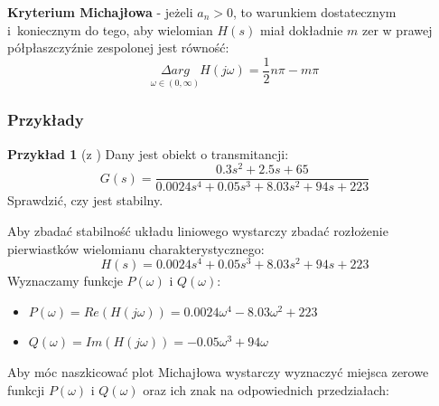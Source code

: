 \documentclass{article}
\begin{document}
    \textbf{Kryterium Michajłowa} - jeżeli $a_{n} > 0$, to warunkiem dostatecznym i~koniecznym do tego, aby wielomian $H(s)$ miał dokładnie $m$ zer w prawej półpłaszczyźnie zespolonej jest równość:
    \begin{equation}\label{eq:kryterium_michajlowa}
         \underset{\omega \in (0, \infty)}{\Delta arg} H(j\omega) = \frac{1}{2}n\pi - m\pi
    \end{equation}

        \subsubsection{Przykłady}
        \textbf{Przykład 1} (z \cite{Grabowski2022})
        Dany jest obiekt o transmitancji:
        $$ 
            G(s) = \frac{0.3s^{2} + 2.5s + 65}{0.0024s^{4} + 0.05s^{3} + 8.03s^{2} + 94s + 223}
        $$
        Sprawdzić, czy jest stabilny.
    
        Aby zbadać stabilność układu liniowego wystarczy zbadać rozłożenie pierwiastków wielomianu charakterystycznego:
        $$
            H(s) = 0.0024s^{4} + 0.05s^{3} + 8.03s^{2} + 94s + 223
        $$
        Wyznaczamy funkcje $P(\omega)$ i $Q(\omega)$:
        \begin{itemize}
            \item $P(\omega) = Re(H(j\omega)) = 0.0024\omega^{4} - 8.03\omega^{2} + 223$
            \item $Q(\omega) = Im(H(j\omega)) = -0.05\omega^{3} + 94\omega$
        \end{itemize}
        Aby móc naszkicować plot Michajłowa wystarczy wyznaczyć miejsca zerowe funkcji $P(\omega)$ i $Q(\omega)$ oraz ich znak na odpowiednich przedziałach:
        
\end{document}
